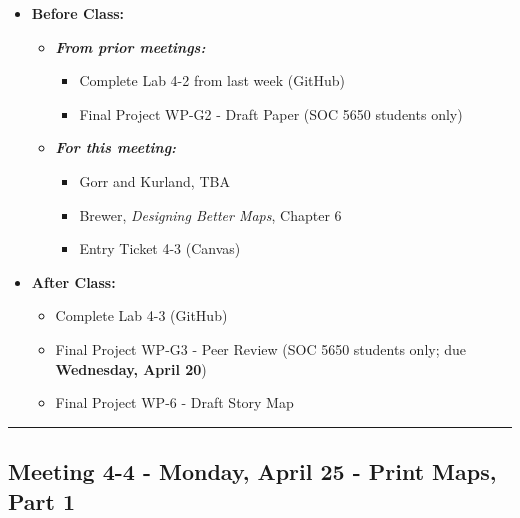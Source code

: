 \documentclass[
]{book}
\providecommand{\tightlist}{%
  \setlength{\itemsep}{0pt}\setlength{\parskip}{0pt}}
\begin{document}
\begin{itemize}
\tightlist
\item
  \textbf{Before Class:}

  \begin{itemize}
  \tightlist
  \item
    \textbf{\emph{From prior meetings:}}

    \begin{itemize}
    \tightlist
    \item
      Complete Lab 4-2 from last week (GitHub)
    \item
      Final Project WP-G2 - Draft Paper (SOC 5650 students only)
    \end{itemize}
  \item
    \textbf{\emph{For this meeting:}}

    \begin{itemize}
    \tightlist
    \item
      Gorr and Kurland, TBA
    \item
      Brewer, \emph{Designing Better Maps}, Chapter 6
    \item
      Entry Ticket 4-3 (Canvas)
    \end{itemize}
  \end{itemize}
\item
  \textbf{After Class:}

  \begin{itemize}
  \tightlist
  \item
    Complete Lab 4-3 (GitHub)
  \item
    Final Project WP-G3 - Peer Review (SOC 5650 students only; due \textbf{Wednesday, April 20})
  \item
    Final Project WP-6 - Draft Story Map
  \end{itemize}
\end{itemize}

\begin{center}\rule{0.5\linewidth}{0.5pt}\end{center}

\hypertarget{meeting-4-4---monday-april-25---print-maps-part-1}{%
\subsection*{Meeting 4-4 - Monday, April 25 - Print Maps, Part 1}\label{meeting-4-4---monday-april-25---print-maps-part-1}}
\end{document}
